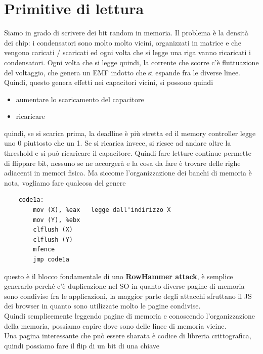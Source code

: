\documentclass[12pt, oneside]{extbook} %
\begin{document}
\section{Primitive di lettura}
Siamo in grado di scrivere dei bit random in memoria. Il problema è la densità dei chip: i condensatori sono molto molto vicini, organizzati in matrice e che vengono caricati / scaricati ed ogni volta che si legge una riga vanno ricaricati i condensatori. Ogni volta che si legge quindi, la corrente che scorre c'è fluttuazione del voltaggio, che genera un EMF indotto che si espande fra le diverse linee. Quindi, questo genera effetti nei capacitori vicini, si possono quindi
\begin{itemize}
\item aumentare lo scaricamento del capacitore
\item ricaricare
\end{itemize}
quindi, se si scarica prima, la deadline è più stretta ed il memory controller legge uno 0 piuttosto che un 1. Se si ricarica invece, si riesce ad andare oltre la threshold e si può ricaricare il capacitore. Quindi fare letture continue permette di flippare bit, nessuno se ne accorgerà e la cosa da fare è trovare delle righe adiacenti in memori fisica. Ma siccome l'organizzazione dei banchi di memoria è nota, vogliamo fare qualcosa del genere
\begin{lstlisting}
	code1a:
		mov (X), %eax	legge dall'indirizzo X
		mov (Y), %ebx
		clflush (X)
		clflush (Y)
		mfence
		jmp code1a
\end{lstlisting}
questo è il blocco fondamentale di uno \textbf{RowHammer attack}, è semplice generarlo perché c'è duplicazione nel SO in quanto diverse pagine di memoria sono condivise fra le applicazioni, la maggior parte degli attacchi sfruttano il JS dei browser in quanto sono utilizzate molto le pagine condivise.\\Quindi semplicemente leggendo pagine di memoria e conoscendo l'organizzazione della memoria, possiamo capire dove sono delle linee di memoria vicine.\\ Una pagina interessante che può essere sharata è codice di libreria crittografica, quindi possiamo fare il flip di un bit di una chiave
\end{document}
